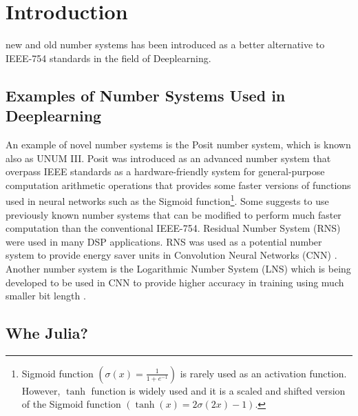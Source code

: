 \section{Introduction}

 new and old number systems has been introduced as a better alternative to IEEE-754 standards\cite{754} in the field of Deeplearning.

\subsection{Examples of Number Systems Used in Deeplearning}

An example of novel number systems is the Posit number system\cite{Gustafson2017}, which is known also as UNUM III. Posit was introduced as an advanced number system that overpass IEEE standards as a hardware-friendly system for general-purpose computation arithmetic operations that provides some faster versions of functions used in neural networks such as the Sigmoid function\footnote{Sigmoid function $\left(\sigma(x) = \frac{1}{1 + e^{-1}}\right)$ is rarely used as an activation function. However, $\tanh$ function is widely used and it is a scaled and shifted version of the Sigmoid function $\left(\tanh(x) = 2 \sigma(2x) -1\right)$.}. Some suggests to use previously known number systems that can be modified to perform much faster computation than the conventional IEEE-754. Residual Number System (RNS) \cite{Garner1959} were used in many DSP applications. RNS was used as a potential number system to provide energy saver units in Convolution Neural Networks (CNN) \cite{Miyashita2016}. Another number system is the Logarithmic Number System (LNS) \cite{Kingsbury1971,Alexopoulos1975,Lee1977} which is being developed to be used in CNN to provide higher accuracy in training using much smaller bit length \cite{Miyashita2016}.

\subsection{Whe Julia?}
